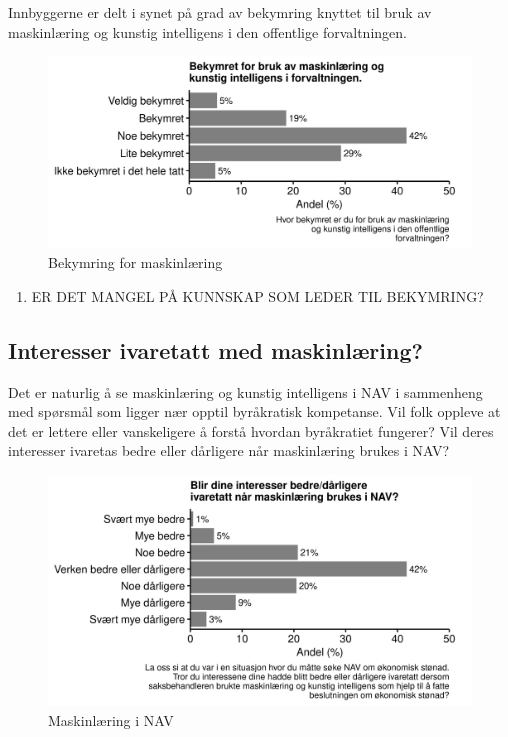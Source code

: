 \documentclass[
]{book}
\providecommand{\tightlist}{%
  \setlength{\itemsep}{0pt}\setlength{\parskip}{0pt}}
\begin{document}
Innbyggerne er delt i synet på grad av bekymring knyttet til bruk av maskinlæring og kunstig intelligens i den offentlige forvaltningen.

\begin{figure}
\centering
\includegraphics{figs/png/fig_ml_worried.png}
\caption{Bekymring for maskinlæring}
\end{figure}

\begin{enumerate}
\def\labelenumi{\arabic{enumi}.}
\setcounter{enumi}{1}
\tightlist
\item
  ER DET MANGEL PÅ KUNNSKAP SOM LEDER TIL BEKYMRING?
\end{enumerate}

\hypertarget{interesser-ivaretatt-med-maskinluxe6ring}{%
\subsection{Interesser ivaretatt med maskinlæring?}\label{interesser-ivaretatt-med-maskinluxe6ring}}

Det er naturlig å se maskinlæring og kunstig intelligens i NAV i sammenheng med spørsmål som ligger nær opptil byråkratisk kompetanse.
Vil folk oppleve at det er lettere eller vanskeligere å forstå hvordan byråkratiet fungerer?
Vil deres interesser ivaretas bedre eller dårligere når maskinlæring brukes i NAV?

\begin{figure}
\centering
\includegraphics{figs/png/fig_nav_ml_helps_interest.png}
\caption{Maskinlæring i NAV}
\end{figure}
\end{document}
